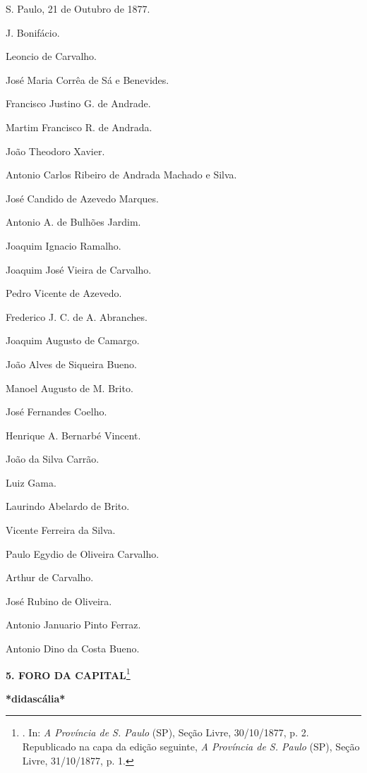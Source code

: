 S. Paulo, 21 de Outubro de 1877.

J. Bonifácio.

Leoncio de Carvalho.

José Maria Corrêa de Sá e Benevides.

Francisco Justino G. de Andrade.

Martim Francisco R. de Andrada.

João Theodoro Xavier.

Antonio Carlos Ribeiro de Andrada Machado e Silva.

José Candido de Azevedo Marques.

Antonio A. de Bulhões Jardim.

Joaquim Ignacio Ramalho.

Joaquim José Vieira de Carvalho.

Pedro Vicente de Azevedo.

Frederico J. C. de A. Abranches.

Joaquim Augusto de Camargo.

João Alves de Siqueira Bueno.

Manoel Augusto de M. Brito.

José Fernandes Coelho.

Henrique A. Bernarbé Vincent.

João da Silva Carrão.

Luiz Gama.

Laurindo Abelardo de Brito.

Vicente Ferreira da Silva.

Paulo Egydio de Oliveira Carvalho.

Arthur de Carvalho.

José Rubino de Oliveira.

Antonio Januario Pinto Ferraz.

Antonio Dino da Costa Bueno.

\textbf{5. FORO DA CAPITAL}\footnote{. In: \emph{A Província de S.
  Paulo} (SP), Seção Livre, 30/10/1877, p. 2. Republicado na capa da
  edição seguinte, \emph{A Província de S. Paulo} (SP), Seção Livre,
  31/10/1877, p. 1.}

\textbf{*didascália*}

